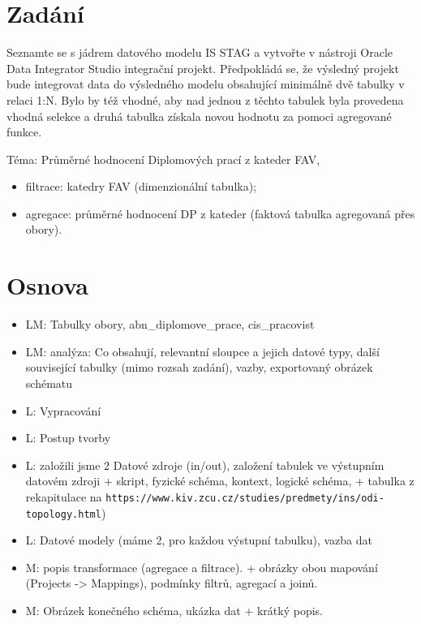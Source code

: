 \section{Zadání}

Seznamte se s jádrem datového modelu IS STAG a vytvořte v nástroji Oracle Data Integrator Studio integrační projekt.
Předpokládá se, že výsledný projekt bude integrovat data do výsledného modelu obsahující minimálně dvě tabulky v relaci 1:N.
Bylo by též vhodné, aby nad jednou z těchto tabulek byla provedena vhodná selekce a druhá tabulka získala novou hodnotu za pomoci agregované funkce.

Téma: Průměrné hodnocení Diplomových prací z kateder FAV,

\begin{itemize}
    \item filtrace: katedry FAV (dimenzionální tabulka);
    \item agregace: průměrné hodnocení DP z kateder (faktová tabulka agregovaná přes obory).
\end{itemize}

\section{Osnova}

\begin{itemize}
    \item LM: Tabulky obory, abn\_diplomove\_prace, cis\_pracovist
    \item LM: analýza: Co obsahují, relevantní sloupce a jejich datové typy, další související tabulky (mimo rozsah zadání), vazby, exportovaný obrázek schématu
    \item L: Vypracování
    \item L: Postup tvorby
    \item L: založili jsme 2 Datové zdroje (in/out), založení tabulek ve výstupním datovém zdroji + skript, fyzické schéma, kontext, logické schéma, + tabulka z rekapitulace na \nolinkurl{https://www.kiv.zcu.cz/studies/predmety/ins/odi-topology.html})
    \item L: Datové modely (máme 2, pro každou výstupní tabulku), vazba dat
    \item M: popis transformace (agregace a filtrace). + obrázky obou mapování (Projects -> Mappings), podmínky filtrů, agregací a joinů.
    \item M: Obrázek konečného schéma, ukázka dat + krátký popis.
\end{itemize}

